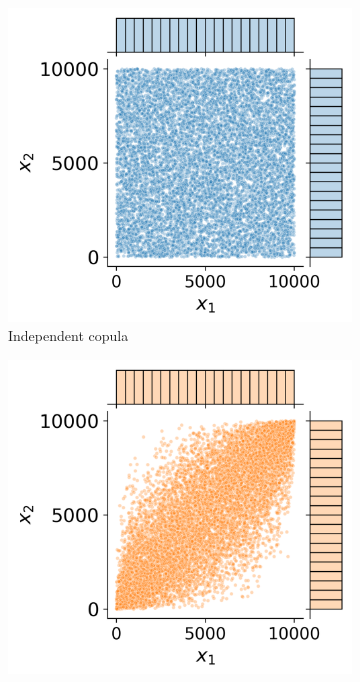 \begin{figure}[ht]
    \centering
    \begin{subfigure}[b]{0.32\textwidth}
        \centering
        \includegraphics[width=\textwidth]{../numerical_experiments/chapter1/figures/independent_copula_ranked.png}
        \caption{Independent copula}
    \end{subfigure}
    \hfill
    \begin{subfigure}[b]{0.32\textwidth}
        \centering
        \includegraphics[width=\textwidth]{../numerical_experiments/chapter1/figures/normal_copula_ranked.png}

\end{subfigure}
\end{figure}
